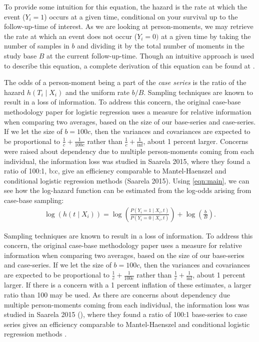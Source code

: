 \documentclass[AMA,STIX1COL,]{WileyNJD-v2}
\begin{document}
To provide some intuition for this equation, the hazard is the rate at
which the event (\(Y_{i}=1\)) occurs at a given time, conditional on
your survival up to the follow-up-time of interest. As we are looking at
person-moments, we may retrieve the rate at which an event does not
occur (\(Y_{i}=0)\) at a given time by taking the number of samples in
\(b\) and dividing it by the total number of moments in the study base
\(B\) at the current follow-up-time. Though an intuitive approach is
used to describe this equation, a complete derivation of this equation
can be found at \citep{saarela2015}.

The odds of a person-moment being a part of the \emph{case series} is
the ratio of the hazard \(h(T_i \mid X_i)\) and the uniform rate
\(b/B\). Sampling techniques are known to result in a loss of
information. To address this concern, the original case-base methodology
paper for logistic regression uses a measure for relative information
when comparing two averages, based on the size of our base-series and
case-series. If we let the size of \(b=100c\), then the variances and
covariances are expected to be proportional to
\(\frac{1}{c}+\frac{1}{100c}\) rather than
\(\frac{1}{c}+\frac{1}{\inf}\), about 1 percent larger. Concerns were
raised about dependency due to multiple person-moments coming from each
individual, the information loss was studied in Saarela 2015, where they
found a ratio of 100:1, b:c, give an efficiency comparable to
Mantel-Haenszel and conditional logistic regression methods (Saarela
2015). Using \eqref{eqn:main}, we can see how the log-hazard function
can be estimated from the log-odds arising from case-base sampling:
\begin{align}\label{eqn:offset}
\log \left( h\left(t \mid X_i\right)\right) = \log \left(\frac{P\left(Y_i = 1 \mid X_i, t\right)}{P\left(Y_i = 0 \mid X_i, t\right)}\right) + \log\left(\frac{b}{B}\right).
\end{align}

Sampling techniques are known to result in a loss of information. To
address this concern, the original case-base methodology paper uses a
measure for relative information when comparing two averages, based on
the size of our base-series and case-series. If we let the size of
\(b=100c\), then the variances and covariances are expected to be
proportional to \(\frac{1}{c}+\frac{1}{100c}\) rather than
\(\frac{1}{c}+\frac{1}{\inf}\), about 1 percent larger. If there is a
concern with a 1 percent inflation of these estimates, a larger ratio
than 100 may be used. As there are concerns about dependency due
multiple person-moments coming from each individual, the information
loss was studied in Saarela 2015 (\citep{saarela2015}), where they found
a ratio of 100:1 base-series to case series gives an efficiency
comparable to Mantel-Haenszel and conditional logistic regression
methods \citep{saarela2015}.
\end{document}

